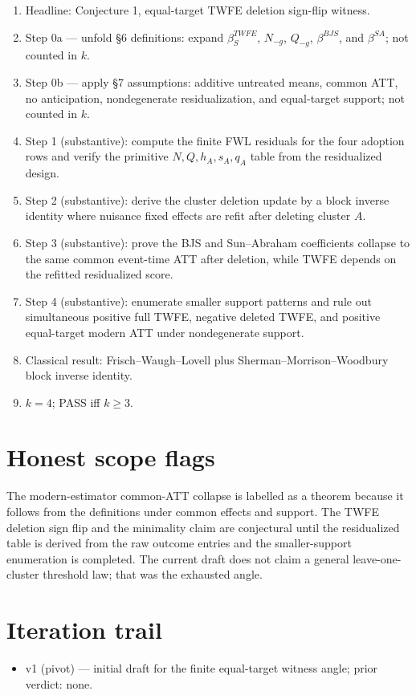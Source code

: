 \documentclass[11pt]{article}
\theoremstyle{definition}
\theoremstyle{plain}
\theoremstyle{remark}
\begin{document}
\begin{enumerate}[leftmargin=*]
\item Headline: Conjecture 1, equal-target TWFE deletion sign-flip witness.
\item Step 0a --- unfold \S6 definitions: expand \(\beta^{TWFE}_{S}\), \(N_{-g}\), \(Q_{-g}\), \(\beta^{BJS}\), and \(\beta^{SA}\); not counted in \(k\).
\item Step 0b --- apply \S7 assumptions: additive untreated means, common ATT, no anticipation, nondegenerate residualization, and equal-target support; not counted in \(k\).
\item Step 1 (substantive): compute the finite FWL residuals for the four adoption rows and verify the primitive \(N,Q,h_A,s_A,q_A\) table from the residualized design.
\item Step 2 (substantive): derive the cluster deletion update by a block inverse identity where nuisance fixed effects are refit after deleting cluster \(A\).
\item Step 3 (substantive): prove the BJS and Sun--Abraham coefficients collapse to the same common event-time ATT after deletion, while TWFE depends on the refitted residualized score.
\item Step 4 (substantive): enumerate smaller support patterns and rule out simultaneous positive full TWFE, negative deleted TWFE, and positive equal-target modern ATT under nondegenerate support.
\item Classical result: Frisch--Waugh--Lovell plus Sherman--Morrison--Woodbury block inverse identity.
\item \(k=4\); PASS iff \(k\ge 3\).
\end{enumerate}

\section{Honest scope flags}
The modern-estimator common-ATT collapse is labelled as a theorem because it follows from the definitions under common effects and support.  The TWFE deletion sign flip and the minimality claim are conjectural until the residualized table is derived from the raw outcome entries and the smaller-support enumeration is completed.  The current draft does not claim a general leave-one-cluster threshold law; that was the exhausted angle.

\section{Iteration trail}
\begin{itemize}[leftmargin=*]
\item v1 (pivot) --- initial draft for the finite equal-target witness angle; prior verdict: none.
\end{itemize}
\end{document}
